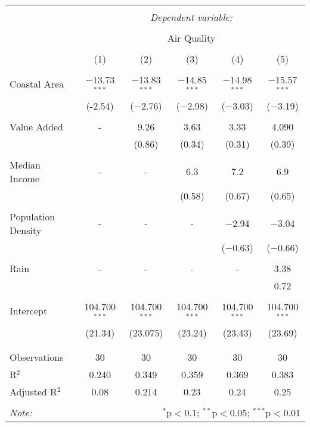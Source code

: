 \documentclass[
]{article}
\begin{document}
\begin{table}[!htbp] \centering 
  \label{} 
\begin{tabular}{@{\extracolsep{5pt}}lccccc} 
\\[-1.8ex]\hline 
\hline \\[-1.8ex] 
 & \multicolumn{5}{c}{\textit{Dependent variable:}} \\ 
\cline{2-6} 
\\[-1.8ex] & \multicolumn{5}{c}{Air Quality} \\ 
\\[-1.8ex] & (1) & (2) & (3) & (4) & (5)\\ 
\hline \\[-1.8ex] 
 Coastal Area & $-$13.73$^{***}$ & $-$13.83$^{***}$ & $-$14.85$^{***}$ & $-$14.98$^{***}$ & $-$15.57$^{***}$ \\ 
  & (-2.54) & ($-$2.76) & ($-$2.98) & ($-$3.03) & ($-$3.19) \\ 
  & & & & & \\ 
 Value Added & - & 9.26 & 3.63 & 3.33 & 4.090 \\ 
  &  & (0.86) & (0.34) & (0.31) & (0.39) \\ 
  & & & & & \\ 
 Median Income & - & - & 6.3 & 7.2 & 6.9 \\ 
  &  &  & (0.58) & (0.67) & (0.65) \\ 
  & & & & & \\ 
 Population Density & - & - & - & $-$2.94 & $-$3.04 \\ 
  &  &  &  & ($-$0.63) & ($-$0.66) \\ 
  & & & & & \\ 
  Rain  & - & - & - & - & 3.38 \\ 
  &  &  &  & & 0.72 \\ 
  & & & & & \\ 
 Intercept & 104.700$^{***}$ & 104.700$^{***}$ & 104.700$^{***}$ & 104.700$^{***}$ & 104.700$^{***}$ \\ 
  & (21.34) & (23.075) & (23.24) & (23.43) & (23.69) \\ 
  & & & & & \\ 
\hline \\[-1.8ex] 
Observations & 30 & 30 & 30 & 30 & 30 \\ 
R$^{2}$ & 0.240 & 0.349 & 0.359 & 0.369 & 0.383 \\ 
Adjusted R$^{2}$ & 0.08 & 0.214 & 0.23 & 0.24 & 0.25 \\ 
\hline 
\hline \\[-1.8ex] 
\textit{Note:}  & \multicolumn{5}{r}{$^{*}$p$<$0.1; $^{**}$p$<$0.05; $^{***}$p$<$0.01} \\ 
\end{tabular} 
\end{table}
\end{document}
